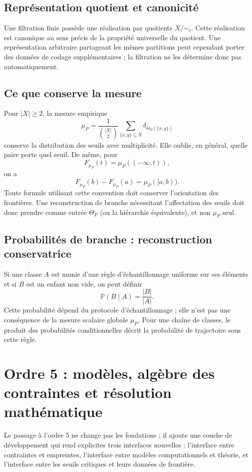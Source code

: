 \documentclass[11pt,a4paper,openany]{book}
\begin{document}
\section{Représentation quotient et canonicité}
Une filtration finie possède une réalisation par quotients
$X/{\sim_t}$. Cette réalisation est canonique au sens précis de la propriété universelle du quotient. Une représentation arbitraire partageant les mêmes partitions peut cependant porter des données de codage supplémentaires ; la filtration ne les détermine donc pas automatiquement.

\section{Ce que conserve la mesure}
Pour $|X|\ge2$, la mesure empirique
\[
\mu_P=\frac{1}{\binom{|X|}{2}}
\sum_{\{x,y\}\subseteq X}\delta_{\Theta_P(\{x,y\})}
\]
conserve la distribution des seuils avec multiplicité. Elle oublie, en général, quelle paire porte quel seuil. De même, pour
\[
F_{\mu_P}(t)=\mu_P((-\infty,t)),
\]
on a
\[
F_{\mu_P}(b)-F_{\mu_P}(a)=\mu_P([a,b)).
\]
Toute formule utilisant cette convention doit conserver l'orientation des frontières. Une reconstruction de branche nécessitant l'affectation des seuils doit donc prendre comme entrée $\Theta_P$ (ou la hiérarchie équivalente), et non $\mu_P$ seul.

\section{Probabilités de branche : reconstruction conservatrice}
Si une classe $A$ est munie d'une règle d'échantillonnage uniforme sur ses éléments et si $B$ est un enfant non vide, on peut définir
\[
\mathbb P(B\mid A)=\frac{|B|}{|A|}.
\]
Cette probabilité dépend du protocole d'échantillonnage ; elle n'est pas une conséquence de la mesure scalaire globale $\mu_P$. Pour une chaîne de classes, le produit des probabilités conditionnelles décrit la probabilité de trajectoire sous cette règle.



\chapter{Ordre 5 : modèles, algèbre des contraintes et résolution mathématique}
Le passage à l'ordre 5 ne change pas les fondations ; il ajoute une couche de développement qui rend explicites trois interfaces nouvelles : l'interface entre contraintes et empreintes, l'interface entre modèles computationnels et théorie, et l'interface entre les seuils critiques et leurs données de frontière.
\end{document}
